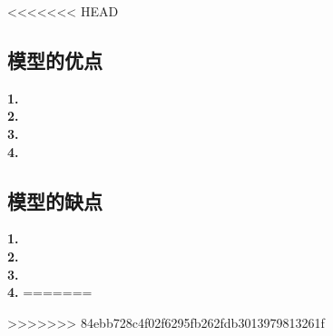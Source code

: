 \documentclass[../main.tex]{subfiles}
\begin{document}
<<<<<<< HEAD
\subsection{模型的优点}
\noindent\textbf{1.}
\\
\textbf{2.}
\\
\textbf{3.}
\\
\textbf{4.}
\subsection{模型的缺点}
\noindent\textbf{1.}
\\
\textbf{2.}
\\
\textbf{3.}
\\
\textbf{4.}
=======

>>>>>>> 84ebb728c4f02f6295fb262fdb3013979813261f
\end{document}
